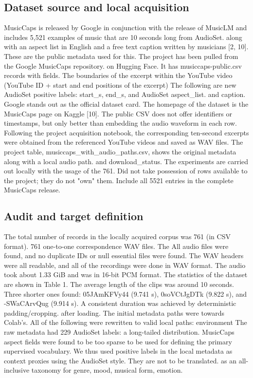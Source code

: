 \documentclass[10pt,twocolumn,letterpaper]{article}
\begin{document}
\subsection{Dataset source and local acquisition}
MusicCaps is released by Google in conjunction with the release of MusicLM and includes 5,521 examples of music that are 10 seconds long from AudioSet. along with an aspect list in English and a free text caption written by musicians [2, 10]. These are the public metadata used for this. The project has been pulled from the Google MusicCaps repository. on Hugging Face. It has musiccaps-public.csv records with fields. The boundaries of the excerpt within the YouTube video (YouTube ID + start and end positions of the excerpt) The following are new AudioSet positive labels: start\_s, end\_s, and AudioSet aspect\_list. and caption. Google stands out as the official dataset card. The homepage of the dataset is the MusicCaps page on Kaggle [10]. The public CSV does not offer identifiers or timestamps, but only better than embedding the audio waveform in each row. Following the project acquisition notebook, the corresponding ten-second excerpts were obtained from the referenced YouTube videos and saved as WAV files. The project table, musiccaps\_with\_audio\_paths.csv, shows the original metadata along with a local audio path. and download\_status. The experiments are carried out locally with the usage of the 761. Did not take possession of rows available to the project; they do not "own" them. Include all 5521 entries in the complete MusicCaps release.

\subsection{Audit and target definition}
The total number of records in the locally acquired corpus was 761 (in CSV format). 761 one-to-one correspondence WAV files. The All audio files were found, and no duplicate IDs or null essential files were found. The WAV headers were all readable, and all of the recordings were done in WAV format. The audio took about 1.33 GiB and was in 16-bit PCM format. The statistics of the dataset are shown in Table 1. The average length of the clips was around 10 seconds. Three shorter ones found: 05JAmKFVy44 (9.741 s), 0soVCtJgDTk (9.822 s), and -SWaCArvQug (9.914 s). A consistent duration was achieved by deterministic padding/cropping. after loading. The initial metadata paths were towards Colab's. All of the following were rewritten to valid local paths: environment The raw metadata had 229 AudioSet labels: a long-tailed distribution. MusicCaps aspect fields were found to be too sparse to be used for defining the primary supervised vocabulary. We thus used positive labels in the local metadata as context proxies using the AudioSet style. They are not to be translated. as an all-inclusive taxonomy for genre, mood, musical form, emotion.
\end{document}
